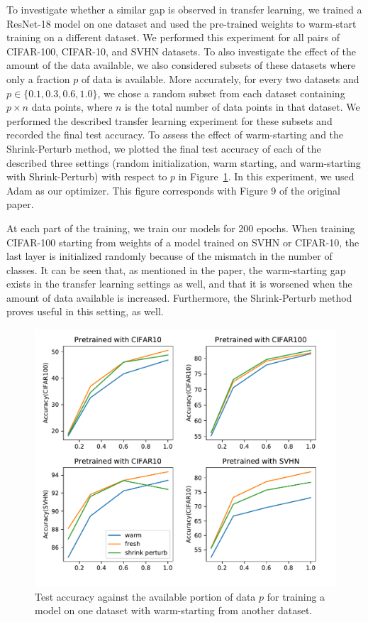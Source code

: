 To investigate whether a similar gap is observed in transfer learning, we trained a ResNet-18 model on one dataset and used the pre-trained weights to warm-start training on a different dataset. We performed this experiment for all pairs of CIFAR-100, CIFAR-10, and SVHN datasets. To also investigate the effect of the amount of the data available, we also considered subsets of these datasets where only a fraction $p$ of data is available. More accurately, for every two datasets and $p \in \{0.1, 0.3, 0.6, 1.0\}$, we chose a random subset from each dataset containing $p \times n$ data points, where $n$ is the total number of data points in that dataset. We performed the described transfer learning experiment for these subsets and recorded the final test accuracy. To assess the effect of warm-starting and the Shrink-Perturb method, we plotted the final test accuracy of each of the described three settings (random initialization, warm starting, and warm-starting with Shrink-Perturb) with respect to $p$ in Figure~\ref{fig:fig9}. In this experiment, we used Adam as our optimizer. This figure corresponds with Figure 9 of the original paper.



At each part of the training, we train our models for 200 epochs. When training CIFAR-100 starting from weights of a model trained on SVHN or CIFAR-10, the last layer is initialized randomly because of the mismatch in the number of classes. It can be seen that, as mentioned in the paper, the warm-starting gap exists in the transfer learning settings as well, and that it is worsened when the amount of data available is increased. Furthermore, the Shrink-Perturb method proves useful in this setting, as well. 


%
%
%
%
%
%
%
%
%
%
%
%
%
%

%
\begin{figure}
    \vspace{-10pt}
    \centering
    \includegraphics[width=.5\linewidth]{figures/figure9.pdf}
    \caption{Test accuracy against the available portion of data $p$ for training a model on one dataset with warm-starting from another dataset. }
    \label{fig:fig9}
    \vspace{-15pt}
\end{figure}




